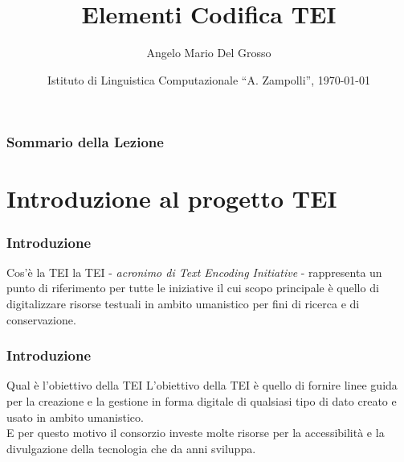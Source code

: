 \documentclass{beamer}
\title{Elementi Codifica TEI}
\author[A.M. Del Grosso]{Angelo Mario Del Grosso}
\institute{\texttt{angelo.delgrosso@ilc.cnr.it} \\\bigskip\textit{CNR-ILC-LicoLab} \\\bigskip\url{http://licolab.ilc.cnr.it/}}
\date{Istituto di Linguistica Computazionale ``A. Zampolli'', \today}
\begin{document}
\begin{frame}
	\maketitle
\end{frame}

\begin{frame}
	\frametitle{Sommario della Lezione}
	\tableofcontents
\end{frame}

\section{Introduzione al progetto TEI}

\begin{frame}
	\frametitle{Introduzione}
	\addtocounter{nframe}{1}
    

    \begin{block}{Cos'è la TEI}
        la TEI - \textit{acronimo di Text Encoding Initiative} - rappresenta un punto di riferimento per tutte le iniziative il cui scopo principale è quello di digitalizzare risorse testuali in ambito umanistico per fini di ricerca e di conservazione.
    \end{block}
    
\end{frame}

\begin{frame}
	\frametitle{Introduzione}
	\addtocounter{nframe}{1}
    
    \begin{block}{Qual è l'obiettivo della TEI}
        L'obiettivo della TEI è quello di fornire linee guida per la creazione e la gestione in forma digitale di qualsiasi tipo di dato creato e usato in ambito umanistico.
        \\ E per questo motivo il consorzio investe molte risorse per la accessibilità e la divulgazione della tecnologia che da anni sviluppa.
    \end{block}
    
\end{frame}
\end{document}
